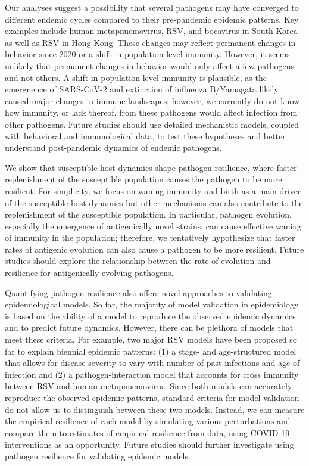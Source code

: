 \documentclass[12pt]{article}
\begin{document}
Our analyses suggest a possibility that several pathogens may have converged to different endemic cycles compared to their pre-pandemic epidemic patterns.
Key examples include human metapnuemovirus, RSV, and bocavirus in South Korea as well as RSV in Hong Kong.
These changes may reflect permanent changes in behavior since 2020 or a shift in population-level immunity.
However, it seems unlikely that permanent changes in behavior would only affect a few pathogens and not others.
A shift in population-level immunity is plausible, as the emergnence of SARS-CoV-2 and extinction of influenza B/Yamagata likely caused major changes in immune landscapes;
however, we currently do not know how immunity, or lack thereof, from these pathogens would affect infection from other pathogens.
Future studies should use detailed mechanistic models, coupled with behavioral and immunological data, to test these hypotheses and better understand post-pandemic dynamics of endemic pathogens.

We show that susceptible host dynamics shape pathogen resilience, where faster replenishment of the susceptible population causes the pathogen to be more resilient.
For simplicity, we focus on waning immunity and birth as a main driver of the susceptible host dynamics but other mechanisms can also contribute to the replenishment of the susceptible population.
In particular, pathogen evolution, especially the emergence of antigenically novel strains, can cause effective waning of immunity in the population;
therefore, we tentatively hypothesize that faster rates of antigenic evolution can also cause a pathogen to be more resilient.
Future studies should explore the relationship between the rate of evolution and resilience for antigenically evolving pathogens.

Quantifying pathogen resilience also offers novel approaches to validating epidemiological models.
So far, the majority of model validation in epidemiology is based on the ability of a model to reproduce the observed epidemic dynamics and to predict future dynamics.
However, there can be plethora of models that meet these criteria.
For example, two major RSV models have been proposed so far to explain biennial epidemic patterns: (1) a stage- and age-structured model that allows for disease severity to vary with number of past infections and age of infection and (2) a pathogen-interaction model that accounts for cross immunity between RSV and human metapnuemovirus.
Since both models can accurately reproduce the observed epidemic patterns, standard criteria for model validation do not allow us to distinguish between these two models.
Instead, we can measure the empirical resilience of each model by simulating various perturbations and compare them to estimates of empirical resilience from data, using COVID-19 interventions as an opportunity.
Future studies should further investigate using pathogen resilience for validating epidemic models.
\end{document}
